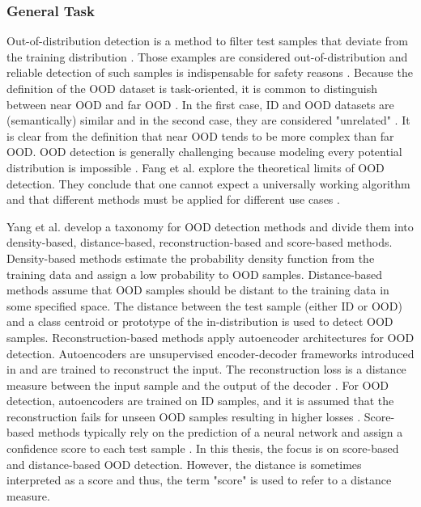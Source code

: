 \subsubsection{General Task}
Out-of-distribution detection is a method to filter test samples that deviate from the training distribution \citep{Yang2021}.
Those examples are considered out-of-distribution and reliable detection of such samples is indispensable for safety reasons \citep{Yang2021}.
Because the definition of the OOD dataset is task-oriented, it is common to distinguish between near OOD and far OOD \citep{Winkens2020}.
In the first case, ID and OOD datasets are (semantically) similar and in the second case, they are considered "unrelated" \citep{Winkens2020}.
It is clear from the definition that near OOD tends to be more complex than far OOD.
OOD detection is generally challenging because modeling every potential distribution is impossible \citep{Salehi2022}.
Fang et al. \citep{Fang2023} explore the theoretical limits of OOD detection.
They conclude that one cannot expect a universally working algorithm and that different methods must be applied for different use cases \citep{Fang2023}.
\par
Yang et al. \citep{Yang2021} develop a taxonomy for OOD detection methods and divide them into density-based, distance-based, reconstruction-based and score-based methods.
Density-based methods estimate the probability density function from the training data and assign a low probability to OOD samples.
Distance-based methods assume that OOD samples should be distant to the training data in some specified space.
The distance between the test sample (either ID or OOD) and a class centroid or prototype of the in-distribution is used to detect OOD samples.
Reconstruction-based methods apply autoencoder architectures for OOD detection.
Autoencoders are unsupervised encoder-decoder frameworks introduced in \citep{Rumelhart1986} and are trained to reconstruct the input.
The reconstruction loss is a distance measure between the input sample and the output of the decoder \citep{Baldi2012, Bank2020}.
For OOD detection, autoencoders are trained on ID samples, and it is assumed that the reconstruction fails for unseen OOD samples resulting in higher losses \citep{Denouden2018}.
Score-based methods typically rely on the prediction of a neural network and assign a confidence score to each test sample \citep{Yang2021}.
In this thesis, the focus is on score-based and distance-based OOD detection.
However, the distance is sometimes interpreted as a score and thus, the term "score" is used to refer to a distance measure.
